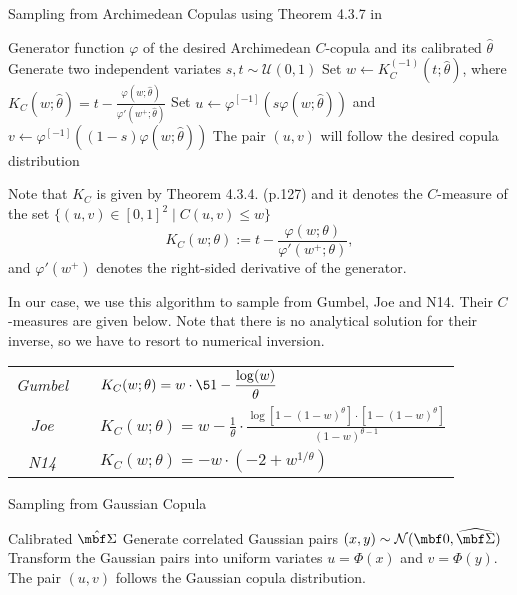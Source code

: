 \documentclass[12pt,a4paper]{article}
\begin{document}
\begin{algorithm}[H]
\caption{Sampling from Archimedean Copulas using Theorem 4.3.7 in \cite{Nelsen2006}}
\label{alg:sampling_theorem_nelsen}
\begin{algorithmic}[1]
\Require Generator function $\varphi$ of the desired Archimedean $C$-copula and its calibrated $\hat \theta$
\State Generate two independent variates $s,t\sim\mathcal U(0,1)$
\State Set $w \gets K_C^{(-1)}(t;\hat \theta)$, where 
$\displaystyle K_C(w;\hat \theta) = t - \frac{\varphi(w;\hat \theta)}{\varphi'(w^+;\hat \theta)}$
\State Set $u \gets \varphi^{[-1]}(s\varphi(w;\hat \theta))$ and $v \gets \varphi^{[-1]}((1-s)\varphi(w;\hat \theta))$
\Ensure The pair $(u,v)$ will follow the desired copula distribution
\end{algorithmic}
\end{algorithm}
Note that $K_C$ is given by Theorem 4.3.4. (p.127) and it denotes the $C$-measure of the set $\{(u,v)\in [0,1]^2 \mid C(u,v)\leq w\}$
$$
K_C(w; \theta) := t - \frac{\varphi(w; \theta)}{\varphi'(w^+; \theta)},
$$ 
and ${\varphi'(w^+)}$ denotes the right-sided derivative of the generator.

In our case, we use this algorithm to sample from Gumbel, Joe and N14. Their $C$-measures are given  below. Note that there is no analytical solution for their inverse, so we have to resort to numerical inversion.

\vspace{0.2cm}
{\centering
\renewcommand{\arraystretch}{1.8}  
\begin{tabular}{ccp{10cm}}
\textit{Gumbel} && $\displaystyle K_C(w; \theta)=w \cdot \5{1- \frac{\log (w)}{\theta}}$ 
\\
\textit{Joe} && $\displaystyle K_C(w; \theta) = w - \frac{1}{\theta} 
\cdot 
\frac{\log[1-(1-w)^{\theta}] \cdot [1-(1-w)^{\theta}]}
{(1-w)^{\theta-1}}$ 
\\
\textit{N14} && $\displaystyle K_C(w; \theta) = -w \cdot (-2 + w^{1/\theta})$ 
\\
\end{tabular}
\par}


\begin{algorithm}[H]
\label{alg:sampling_gaussian}
\caption{Sampling from Gaussian Copula}
\begin{algorithmic}[1]
\Require Calibrated $\hat{\mbf \Sigma}$ %
\State Generate correlated Gaussian pairs $(x,y)\sim\mathcal N(\mbf 0, \widehat{\mbf \Sigma})$
\State Transform the Gaussian pairs into uniform variates %
$u = \Phi(x)$ and $v = \Phi(y)$.
\Ensure The pair $(u,v)$  follows the Gaussian copula distribution.
\end{algorithmic}
\end{algorithm}
\end{document}
